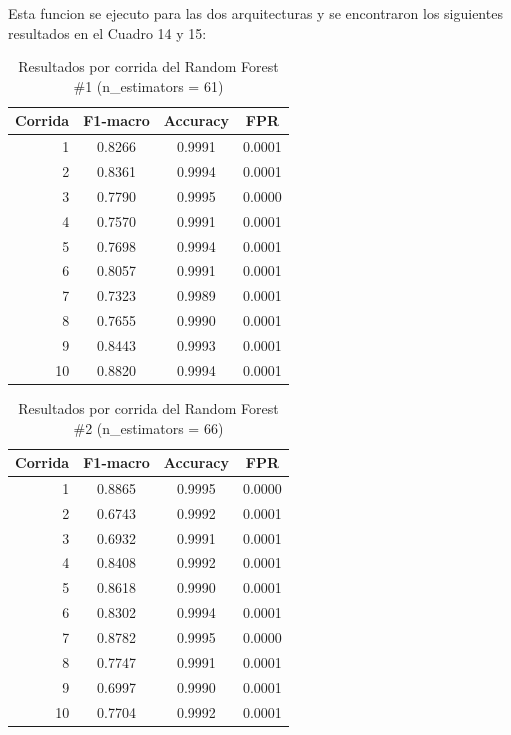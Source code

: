 \documentclass[12pt,a4paper]{article}
\begin{document}
Esta funcion se ejecuto para las dos arquitecturas y se encontraron los siguientes resultados en el Cuadro 14 y 15:

\begin{table}[htbp]
  \centering
  \begin{tabular}{rccc}
    \hline
    Corrida & F1-macro & Accuracy & FPR \\
    \hline
    1  & 0.8266 & 0.9991 & 0.0001 \\
    2  & 0.8361 & 0.9994 & 0.0001 \\
    3  & 0.7790 & 0.9995 & 0.0000 \\
    4  & 0.7570 & 0.9991 & 0.0001 \\
    5  & 0.7698 & 0.9994 & 0.0001 \\
    6  & 0.8057 & 0.9991 & 0.0001 \\
    7  & 0.7323 & 0.9989 & 0.0001 \\
    8  & 0.7655 & 0.9990 & 0.0001 \\
    9  & 0.8443 & 0.9993 & 0.0001 \\
    10 & 0.8820 & 0.9994 & 0.0001 \\
    \hline
  \end{tabular}
  \caption{Resultados por corrida del Random Forest \#1 (n\_estimators = 61)}
  \label{tab:rf1-corridas}
\end{table}

\begin{table}[htbp]
  \centering
  \begin{tabular}{rccc}
    \hline
    Corrida & F1-macro & Accuracy & FPR \\
    \hline
    1  & 0.8865 & 0.9995 & 0.0000 \\
    2  & 0.6743 & 0.9992 & 0.0001 \\
    3  & 0.6932 & 0.9991 & 0.0001 \\
    4  & 0.8408 & 0.9992 & 0.0001 \\
    5  & 0.8618 & 0.9990 & 0.0001 \\
    6  & 0.8302 & 0.9994 & 0.0001 \\
    7  & 0.8782 & 0.9995 & 0.0000 \\
    8  & 0.7747 & 0.9991 & 0.0001 \\
    9  & 0.6997 & 0.9990 & 0.0001 \\
    10 & 0.7704 & 0.9992 & 0.0001 \\
    \hline
  \end{tabular}
  \caption{Resultados por corrida del Random Forest \#2 (n\_estimators = 66)}
  \label{tab:rf2-corridas}
\end{table}
\end{document}
